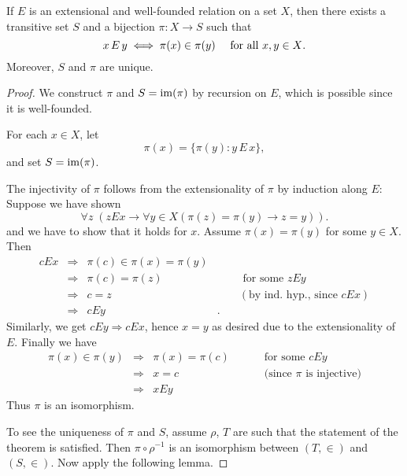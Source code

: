 \begin{theorem}\label{thm-mostowski-collapse}If $E$ is an extensional and well-founded relation on a set $X$, then there exists a transitive set $S$ and a bijection $\pi: X \to S$ such that
\begin{equation*}
x \, E \, y \iff \pi(x) \in \pi(y) \quad \text{ for all $ x,y \in X$}.
\end{equation*}
Moreover, $S$ and $\pi$ are unique.

\end{theorem}\begin{proof}We construct $\pi$ and $S = \operatorname{im}(\pi)$ by recursion on $E$, which is possible since it is well-founded.

For each $x \in X$, let
\begin{equation*}
\pi(x) = \{\pi(y) \colon y \, E \, x \},
\end{equation*}
and set $S = \operatorname{im}(\pi)$.

The injectivity of $\pi$ follows from the extensionality of $\pi$ by induction along $E$: 	
Suppose we have shown
\begin{equation*}
\forall z \; (z E x \to \forall y  \in X (\pi(z) = \pi(y) \to z = y)).
\end{equation*}
and we have to show that it holds for $x$. Assume $\pi(x) = \pi(y)$ for some $y \in X$. Then
\begin{align*}
cEx &\Rightarrow& \pi(c) \in \pi(x) = \pi(y) &\\
&\Rightarrow& \pi(c) = \pi(z) & \qquad \text{ for some } zEy\\
&\Rightarrow& c=z & \qquad  (\text{by ind. hyp., since } cEx)\\
&\Rightarrow& cEy &.
\end{align*}
Similarly, we get $cEy \Rightarrow cEx$, hence $x=y$ as desired due to the extensionality of $E$. Finally we have
\begin{align*}
\pi(x) \in \pi(y) & \Rightarrow & \pi(x) = \pi(c) & \qquad \text{ for some } cEy \\
&\Rightarrow& x = c & \qquad \text{ (since $\pi$ is injective)}\\
&\Rightarrow& xEy &
\end{align*}
Thus $\pi$ is an isomorphism.

To see the uniqueness of $\pi$ and $S$, assume $\rho$, $T$ are such that the statement of the theorem is satisfied. Then $\pi \circ \rho^{ -1}$ is an isomorphism between $(T, \in)$ and $(S,\in)$. Now apply the following lemma.


\end{proof}
